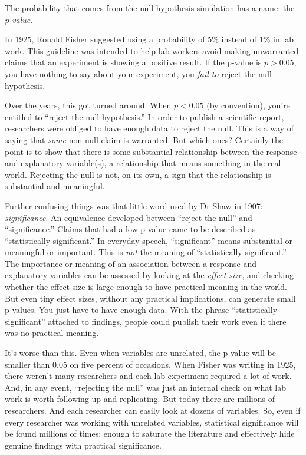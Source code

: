 \documentclass[]{book}
\begin{document}
The probability that comes from the null hypothesis simulation has a name: the \emph{p-value}.

In 1925, Ronald Fisher suggested using a probability of 5\% instead of 1\% in lab work. This guideline was intended to help lab workers avoid making unwarranted claims that an experiment is showing a positive result. If the p-value is \(p > 0.05\), you have nothing to say about your experiment, you \emph{fail to} reject the null hypothesis.

Over the years, this got turned around. When \(p < 0.05\) (by convention), you're entitled to ``reject the null hypothesis.'' In order to publish a scientific report, researchers were obliged to have enough data to reject the null. This is a way of saying that \emph{some} non-null claim is warranted. But which ones? Certainly the point is to show that there is some substantial relationship between the response and explanatory variable(s), a relationship that means something in the real world. Rejecting the null is not, on its own, a sign that the relationship is substantial and meaningful.

Further confusing things was that little word used by Dr Shaw in 1907: \emph{significance}. An equivalence developed between ``reject the null'' and ``significance.'' Claims that had a low p-value came to be described as ``statistically significant.'' In everyday speech, ``significant'' means substantial or meaningful or important. This is \emph{not} the meaning of ``statistically significant.'' The importance or meaning of an association between a response and explanatory variables can be assessed by looking at the \emph{effect size}, and checking whether the effect size is large enough to have practical meaning in the world. But even tiny effect sizes, without any practical implications, can generate small p-values. You just have to have enough data. With the phrase ``statistically significant'' attached to findings, people could publish their work even if there was no practical meaning.

It's worse than this. Even when variables are unrelated, the p-value will be smaller than 0.05 on five percent of occasions. When Fisher was writing in 1925, there weren't many researchers and each lab experiment required a lot of work. And, in any event, ``rejecting the null'' was just an internal check on what lab work is worth following up and replicating. But today there are millions of researchers. And each researcher can easily look at dozens of variables. So, even if every researcher was working with unrelated variables, statistical significance will be found millions of times: enough to saturate the literature and effectively hide genuine findings with practical significance.
\end{document}
